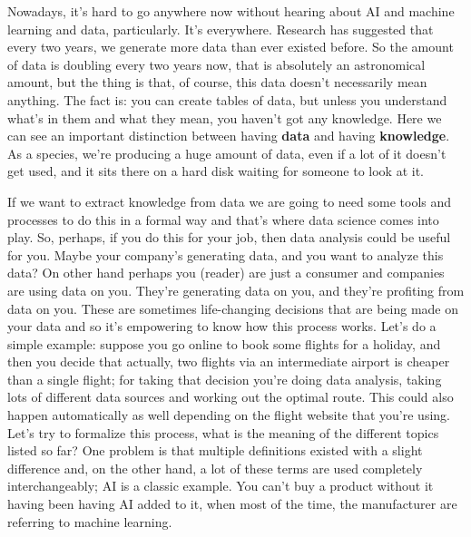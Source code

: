 Nowadays, it's hard to go anywhere now without hearing about AI and machine learning and data, particularly. It's everywhere.
Research has suggested that every two years, we generate more data than ever existed before.
So the amount of data is doubling every two years now, that is absolutely an astronomical amount, 
but the thing is that, of course, this data doesn't necessarily mean anything. 
The fact is: you can create tables of data, but unless you understand what's in them and what they mean, you haven't got any knowledge.
Here we can see an important distinction between having \textbf{data} and having \textbf{knowledge}.
As a species, we're producing a huge amount of data, even if a lot of it doesn't get used, 
and it sits there on a hard disk waiting for someone to look at it.

If we want to extract knowledge from data we are going to need some tools and processes to do this in a formal way and
that's where data science comes into play.
So, perhaps, if you do this for your job, then data analysis could be useful for you.
Maybe your company's generating data, and you want to analyze this data?
On other hand perhaps you (reader) are just a consumer and companies are using data on you. 
They're generating data on you, and they're profiting from data on you. 
These are sometimes life-changing decisions that are being made on your data and so it's empowering to know how this process works.
Let's do a simple example:
suppose you go online to book some flights for a holiday,
and then you decide that actually, two flights via an intermediate airport is cheaper than a single flight;
for taking that decision you're doing data analysis, taking lots of different data sources and working out the optimal route.
This could also happen automatically as well depending on the flight website that you're using.
Let's try to formalize this process, what is the meaning of the different topics listed so far? 
One problem is that multiple definitions existed with a slight difference and, on the other hand, a lot of these terms are used completely interchangeably; 
AI is a classic example. You can't buy a product without it having been having AI added to it, when most of the time, 
the manufacturer are referring to machine learning.


